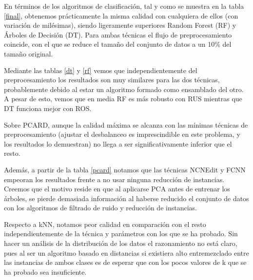 En términos de los algoritmos de clasificación, tal y como se muestra en la tabla \ref{final}, obtenemos prácticamente la misma calidad con cualquiera de ellos (con variación de milésimas), siendo ligeramente superiores Random Forest (RF) y Árboles de Decisión (DT). Para ambas técnicas el flujo de preprocesamiento coincide, con el que se reduce el tamaño del conjunto de datos a un 10\% del tamaño original.

Mediante las tablas \ref{dt} y \ref{rf} vemos que independientemente del preprocesamiento los resultados son muy similares para las dos técnicas, probablemente debido al estar un algoritmo formado como ensamblado del otro. A pesar de esto, vemos que en media RF es más robusto con RUS mientras que DT funciona mejor con ROS.

\vspace{\baselineskip}

Sobre PCARD, aunque la calidad máxima se alcanza con las mínimas técnicas de preprocesamiento (ajustar el desbalanceo es imprescindible en este problema, y los resultados lo demuestran) no llega a ser significativamente inferior que el resto. 

Además, a partir de la tabla \ref{pcard} notamos que las técnicas NCNEdit y FCNN empeoran los resultados frente a no usar ninguna reducción de instancias. Creemos que el motivo reside en que al aplicarse PCA antes de entrenar los árboles, se pierde demasiada información al haberse reducido el conjunto de datos con los algoritmos de filtrado de ruido y reducción de instancias.

\vspace{\baselineskip}

Respecto a kNN, notamos peor calidad en comparación con el resto independientemente de la técnica y parámetros con los que se ha probado. Sin hacer un análisis de la distribución de los datos el razonamiento no está claro, pues al ser un algoritmo basado en distancias si existiera alto entremezclado entre las instancias de ambos clases es de esperar que con los pocos valores de k que se ha probado sea insuficiente.

\newpage

